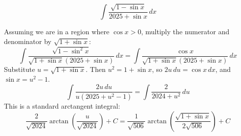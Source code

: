 \begin{questions}
    \question
    \[ \int \frac{\sqrt{1 - \sin x}}{2025 + \sin x} \, dx \]
    \begin{solution}
        Assuming we are in a region where $\cos x > 0$, multiply the numerator and denominator by $\sqrt{1 + \sin x}$:
        \[ \int \frac{\sqrt{1 - \sin^2 x}}{\sqrt{1 + \sin x} (2025 + \sin x)} \, dx = \int \frac{\cos x}{\sqrt{1 + \sin x} (2025 + \sin x)} \, dx \]
        Substitute $u = \sqrt{1 + \sin x}$. Then $u^2 = 1 + \sin x$, so $2u \, du = \cos x \, dx$, and $\sin x = u^2 - 1$.
        \[ \int \frac{2u \, du}{u (2025 + u^2 - 1)} = \int \frac{2}{2024 + u^2} \, du \]
        This is a standard arctangent integral:
        \[ \frac{2}{\sqrt{2024}} \arctan\left(\frac{u}{\sqrt{2024}}\right) + C = \frac{1}{\sqrt{506}} \arctan\left(\frac{\sqrt{1 + \sin x}}{2\sqrt{506}}\right) + C \]
    \end{solution}
\end{questions}

